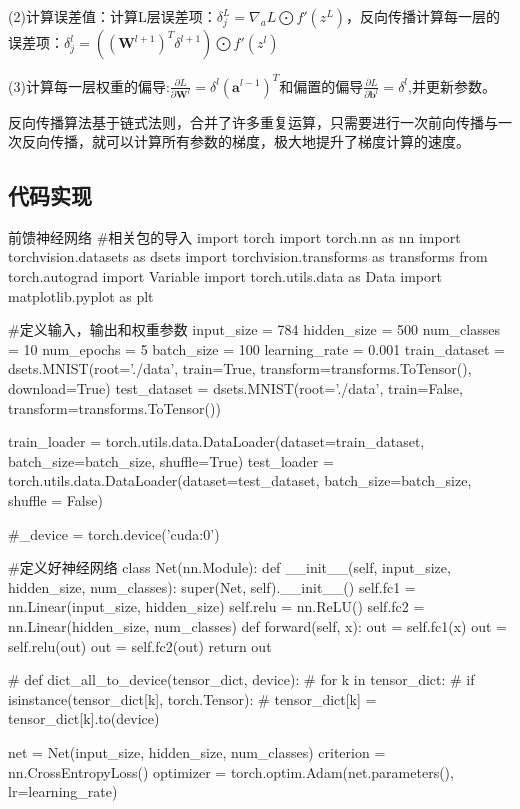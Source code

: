\documentclass[openbib]{article}
\begin{document}
(2)计算误差值：计算L层误差项：$\delta_j^L=\nabla_aL\bigodot f'(z^L)$，反向传播计算每一层的误差项：$\delta_j^l=((\textbf{W}^{l+1})^T\delta^{l+1})\bigodot f'(z^l)$

(3)计算每一层权重的偏导:$\frac{\partial L}{\partial \textbf{W}^l}=\delta^l(\textbf{a}^{l-1})^T$和偏置的偏导$\frac{\partial L}{\partial \textbf{b}^l}=\delta^l$,并更新参数。

反向传播算法基于链式法则，合并了许多重复运算，只需要进行一次前向传播与一次反向传播，就可以计算所有参数的梯度，极大地提升了梯度计算的速度。

\subsection{代码实现}
\begin{Python}{前馈神经网络}
	#相关包的导入
	import torch
	import torch.nn as nn
	import torchvision.datasets as dsets
	import torchvision.transforms as transforms
	from torch.autograd import Variable
	import torch.utils.data as Data
	import matplotlib.pyplot as plt
	
	#定义输入，输出和权重参数
	input_size = 784
	hidden_size = 500
	num_classes = 10
	num_epochs = 5
	batch_size = 100
	learning_rate = 0.001
	train_dataset = dsets.MNIST(root='./data', train=True, transform=transforms.ToTensor(), download=True)
	test_dataset = dsets.MNIST(root='./data', train=False, transform=transforms.ToTensor())
	
	train_loader = torch.utils.data.DataLoader(dataset=train_dataset, batch_size=batch_size, shuffle=True)
	test_loader = torch.utils.data.DataLoader(dataset=test_dataset, batch_size=batch_size, shuffle = False)
	
	#_device = torch.device('cuda:0')
	
	#定义好神经网络
	class Net(nn.Module):
	def __init__(self, input_size, hidden_size, num_classes):
	super(Net, self).__init__()
	self.fc1 = nn.Linear(input_size, hidden_size)
	self.relu = nn.ReLU()
	self.fc2 = nn.Linear(hidden_size, num_classes)
	def forward(self, x):
	out = self.fc1(x)
	out = self.relu(out)
	out = self.fc2(out)
	return out
	
	# def dict_all_to_device(tensor_dict, device):
	#     for k in tensor_dict:
	#         if isinstance(tensor_dict[k], torch.Tensor):
	#             tensor_dict[k] = tensor_dict[k].to(device)
	
	net = Net(input_size, hidden_size, num_classes)
	criterion = nn.CrossEntropyLoss()
	optimizer = torch.optim.Adam(net.parameters(), lr=learning_rate)
	

\end{Python}
\end{document}
